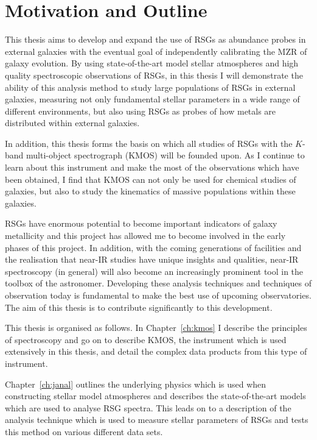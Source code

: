 

\section{Motivation and Outline} %
\label{sec:motivation_and_outline}

This thesis aims to develop and expand the use of RSGs as abundance probes in external galaxies with the eventual goal of independently calibrating the MZR of galaxy evolution.
By using state-of-the-art model stellar atmospheres and high quality spectroscopic observations of RSGs, in this thesis I will demonstrate the ability of this analysis method to study large populations of RSGs in external galaxies, measuring not only fundamental stellar parameters in a wide range of different environments, but also using RSGs as probes of how metals are distributed within external galaxies.

In addition, this thesis forms the basis on which all studies of RSGs with the $K$-band multi-object spectrograph (KMOS) will be founded upon.
As I continue to learn about this instrument and make the most of the observations which have been obtained, I find that KMOS can not only be used for chemical studies of galaxies, but also to study the kinematics of massive populations within these galaxies.

RSGs have enormous potential to become important indicators of galaxy metallicity and this project has allowed me to become involved in the early phases of this project.
In addition, with the coming generations of facilities and the realisation that near-IR studies have unique insights and qualities, near-IR spectroscopy (in general) will also become an increasingly prominent tool in the toolbox of the astronomer.
Developing these analysis techniques and techniques of observation today is fundamental to make the best use of upcoming observatories.
The aim of this thesis is to contribute significantly to this development.

This thesis is organised as follows.
In Chapter~\ref{ch:kmos} I describe the principles of spectroscopy and go on to describe KMOS, the instrument which is used extensively in this thesis, and detail the complex data products from this type of instrument.

Chapter~\ref{ch:janal} outlines the underlying physics which is used when constructing stellar model atmospheres and describes the state-of-the-art models which are used to analyse RSG spectra.
This leads on to a description of the analysis technique which is used to measure stellar parameters of RSGs and tests this method on various different data sets.

